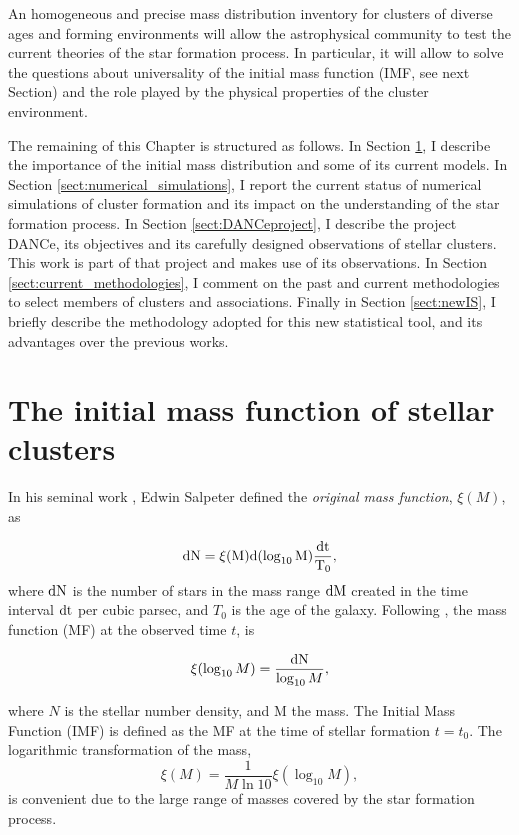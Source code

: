 An homogeneous and precise mass distribution inventory for clusters of diverse ages and forming environments will allow the astrophysical community to test the current theories of the star formation process. In particular, it will allow to solve the questions about universality of the initial mass function (IMF, see next Section) and the role played by the physical properties of the cluster environment.    

The remaining of this Chapter is structured as follows. In Section \ref{sect:IMF}, I describe the importance of the initial mass distribution and some of its current models. In Section \ref{sect:numerical_simulations}, I report the current status of numerical simulations of cluster formation and its impact on the understanding of the star formation process. In Section \ref{sect:DANCeproject}, I describe the project DANCe, its objectives and its carefully designed observations of stellar clusters. This work is part of that project and makes use of its observations. In Section \ref{sect:current_methodologies}, I comment on the past and current methodologies to select members of clusters and associations. Finally in Section \ref{sect:newIS}, I briefly describe the methodology adopted for this new statistical tool, and its advantages over the previous works. 

\section{The initial mass function of stellar clusters}
\label{sect:IMF}

In his seminal work \citep{Salpeter1955}, Edwin Salpeter defined the \emph{original mass function}, $\xi(M)$, as

\begin{equation}
\rm{d}N= \xi(M)\rm{d}(\log_{10} M) \frac{\rm{d}t}{T_0},\nonumber
\end{equation}
where $\rm{d}N$ is the number of stars in the mass range $\rm{d}M$ created in the time interval $\rm{d}t$ per cubic parsec, and $T_0$ is the age of the galaxy. Following \citet{Chabrier2003b},  the mass function (MF) at the observed time $t$, is

\begin{equation}
\xi(\log_{10} M)=\frac{\rm{d}N}{\log_{10} M},\nonumber
\end{equation}

where $N$ is the stellar number density, and M the mass. The Initial Mass Function (IMF) is defined as the MF at the time of stellar formation $t=t_0$. The logarithmic transformation of the mass,
\begin{equation}
\xi(M)=\frac{1}{M \ln 10} \xi (\log_{10} M),\nonumber
\end{equation}
is convenient due to the large range of masses covered by the star formation process.

